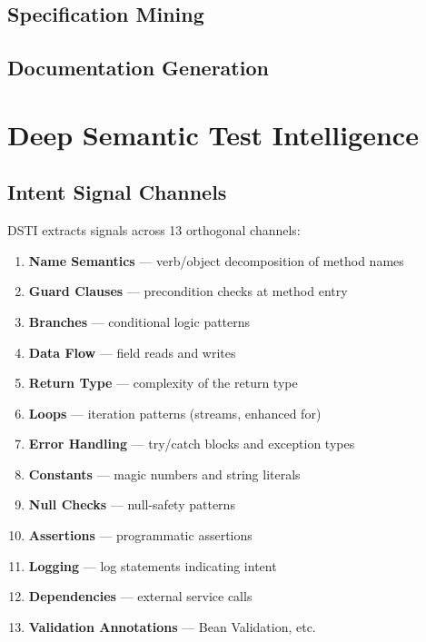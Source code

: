 \documentclass[sigconf,nonacm]{acmart}
\begin{document}
\subsection{Specification Mining}

\subsection{Documentation Generation}

\section{Deep Semantic Test Intelligence}

\subsection{Intent Signal Channels}

DSTI extracts signals across 13 orthogonal channels:

\begin{enumerate}
  \item \textbf{Name Semantics} --- verb/object decomposition of method names
  \item \textbf{Guard Clauses} --- precondition checks at method entry
  \item \textbf{Branches} --- conditional logic patterns
  \item \textbf{Data Flow} --- field reads and writes
  \item \textbf{Return Type} --- complexity of the return type
  \item \textbf{Loops} --- iteration patterns (streams, enhanced for)
  \item \textbf{Error Handling} --- try/catch blocks and exception types
  \item \textbf{Constants} --- magic numbers and string literals
  \item \textbf{Null Checks} --- null-safety patterns
  \item \textbf{Assertions} --- programmatic assertions
  \item \textbf{Logging} --- log statements indicating intent
  \item \textbf{Dependencies} --- external service calls
  \item \textbf{Validation Annotations} --- Bean Validation, etc.
\end{enumerate}
\end{document}
